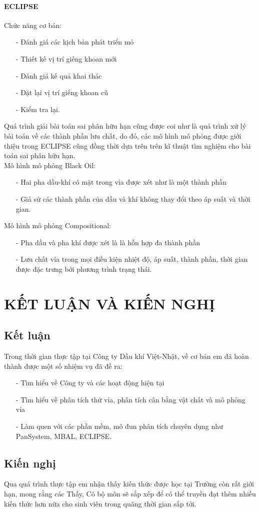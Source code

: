 \documentclass[12pt,a4paper]{report}
\begin{document}
    \subsubsection{ECLIPSE}
Chức năng cơ bản:
	\begin{enumerate}
    	\item[-] Đánh giá các kịch bản phát triển mỏ
        \item[-] Thiết kế vị trí giếng khoan mới
        \item[-] Đánh giá kế quả khai thác
        \item[-] Đặt lại vị trí giếng khoan cũ
        \item[-] Kiểm tra lại.
    \end{enumerate}
Quá trình giải bài toán sai phân hữu hạn cũng được coi như là quá trình xử lý bài toán về các thành phần lưu chất, do đó, các mô hình mô phỏng được giới thiệu trong ECLIPSE cũng đồng thời dựa trên trên kĩ thuật tìm nghiệm cho bài toán sai phân hữu hạn.\\
Mô hình mô phỏng Black Oil:
	\begin{itemize}
    	\item[-] Hai pha dầu-khí có mặt trong vỉa được xét như là một thành phần
        \item[-] Giả sử các thành phần của dầu và khí không thay đổi theo áp suất và thời gian.
    \end{itemize}
Mô hình mô phỏng Compositional:
	\begin{itemize}
    	\item[-] Pha dầu và pha khí được xét là là hỗn hợp đa thành phần
        \item[-] Lưu chất vỉa trong mọi điều kiện nhiệt độ, áp suất, thành phần, thời gian được đặc trưng bởi phương trình trạng thái.
    \end{itemize}  
\chapter{KẾT LUẬN VÀ KIẾN NGHỊ}
\section{Kết luận}
Trong thời gian thực tập tại Công ty Dầu khí Việt-Nhật, về cơ bản em đã hoàn thành được một số nhiệm vụ đã đề ra:
	\begin{itemize}
    	\item[-] Tìm hiểu về Công ty và các hoạt động hiện tại
        \item[-] Tìm hiểu về phân tích thử vỉa, phân tích cân bằng vật chất và mô phỏng vỉa
        \item[-] Làm quen với các phần mềm, mô đun phân tích chuyên dụng như PanSystem, MBAL, ECLIPSE.
    \end{itemize}
\section{Kiến nghị}
Qua quá trình thực tập em nhận thấy kiến thức được học tại Trường còn rất giới hạn, mong rằng các Thầy, Cô bộ môn sẽ sắp xếp để có thể truyền đạt thêm nhiều kiến thức hơn nữa cho sinh viên trong quãng thời gian sắp tới.
\end{document}
